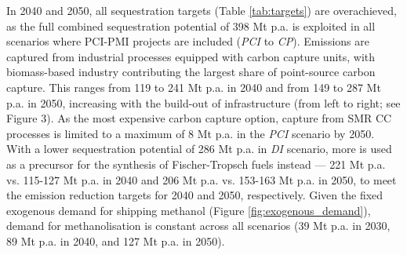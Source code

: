 \documentclass[final,5p,times,twocolumn,sort&compress]{elsarticle}
\begin{document}
In 2040 and 2050, all sequestration targets (Table \ref{tab:targets}) are overachieved, as the full combined  sequestration potential of 398 Mt p.a. is exploited in all scenarios where PCI-PMI projects are included (\textit{PCI} to \textit{CP}). 
Emissions are captured from industrial processes equipped with carbon capture units, with biomass-based industry contributing the largest share of point-source carbon capture. This ranges from 119 to 241 Mt p.a. in 2040 and from 149 to 287 Mt p.a. in 2050, increasing with the build-out of  infrastructure (from left to right; see Figure 3). As the most expensive carbon capture option,  capture from SMR CC processes is limited to a maximum of 8 Mt p.a. in the \textit{PCI} scenario by 2050.
With a lower sequestration potential of 286 Mt p.a. in \textit{DI} scenario, more  is used as a precursor for the synthesis of Fischer-Tropsch fuels instead --- 221 Mt p.a. vs. 115-127 Mt p.a. in 2040 and 206 Mt p.a. vs. 153-163 Mt p.a. in 2050, to meet the emission reduction targets for 2040 and 2050, respectively. 
Given the fixed exogenous demand for shipping methanol (Figure \ref{fig:exogenous_demand}),  demand for methanolisation is constant across all scenarios (39 Mt p.a. in 2030, 89 Mt p.a. in 2040, and 127 Mt p.a. in 2050). 
\end{document}
